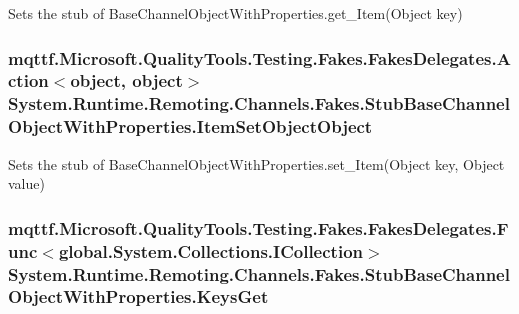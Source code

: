 Sets the stub of Base\-Channel\-Object\-With\-Properties.\-get\-\_\-\-Item(\-Object key)

\hypertarget{class_system_1_1_runtime_1_1_remoting_1_1_channels_1_1_fakes_1_1_stub_base_channel_object_with_properties_a76b8901e077f573c5e5dab2c1cf8e200}{
\subsubsection[{Item\-Set\-Object\-Object}]{\setlength{\rightskip}{0pt plus 5cm}mqttf.\-Microsoft.\-Quality\-Tools.\-Testing.\-Fakes.\-Fakes\-Delegates.\-Action$<$object, object$>$ System.\-Runtime.\-Remoting.\-Channels.\-Fakes.\-Stub\-Base\-Channel\-Object\-With\-Properties.\-Item\-Set\-Object\-Object}}\label{class_system_1_1_runtime_1_1_remoting_1_1_channels_1_1_fakes_1_1_stub_base_channel_object_with_properties_a76b8901e077f573c5e5dab2c1cf8e200}


Sets the stub of Base\-Channel\-Object\-With\-Properties.\-set\-\_\-\-Item(\-Object key, Object value)

\hypertarget{class_system_1_1_runtime_1_1_remoting_1_1_channels_1_1_fakes_1_1_stub_base_channel_object_with_properties_a04154a335a815c043180c37559026387}{
\subsubsection[{Keys\-Get}]{\setlength{\rightskip}{0pt plus 5cm}mqttf.\-Microsoft.\-Quality\-Tools.\-Testing.\-Fakes.\-Fakes\-Delegates.\-Func$<$global.\-System.\-Collections.\-I\-Collection$>$ System.\-Runtime.\-Remoting.\-Channels.\-Fakes.\-Stub\-Base\-Channel\-Object\-With\-Properties.\-Keys\-Get}}\label{class_system_1_1_runtime_1_1_remoting_1_1_channels_1_1_fakes_1_1_stub_base_channel_object_with_properties_a04154a335a815c043180c37559026387}


